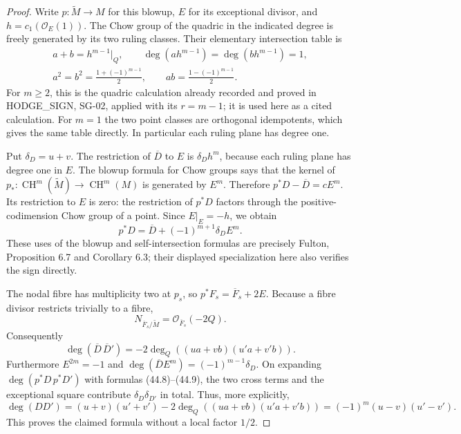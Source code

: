 \begin{proof}
Write $p:\widetilde M\to M$ for this blowup, $E$ for its exceptional
divisor, and $h=c_1(\mathcal O_E(1))$.  The Chow group of the quadric
in the indicated degree is freely generated by its two ruling
classes.  Their elementary intersection table is
\[
 \begin{gathered}
 a+b=h^{m-1}|_Q,\qquad
 \deg(a h^{m-1})=\deg(b h^{m-1})=1,\\
 a^2=b^2=\frac{1+(-1)^{m-1}}2,\qquad
 ab=\frac{1-(-1)^{m-1}}2.
 \end{gathered}                                             \tag{44.7}
\]
For $m\ge2$, this is the quadric calculation already recorded and
proved in HODGE\_SIGN, SG-02, applied with its $r=m-1$; it is used
here as a cited calculation.  For $m=1$ the two point classes are
orthogonal idempotents, which gives the same table directly.
In particular each ruling plane has degree one.

Put $\delta_D=u+v$.  The restriction of $\overline D$ to $E$ is
$\delta_Dh^m$, because each ruling plane has degree one in $E$.
The blowup formula for Chow groups says that the kernel of
$p_*:\operatorname{CH}^{m}(\widetilde M)\to\operatorname{CH}^{m}(M)$
is generated by $E^m$.  Therefore $p^*D-\overline D=cE^m$.
Its restriction to $E$ is zero: the restriction of $p^*D$ factors
through the positive-codimension Chow group of a point.  Since
$E|_E=-h$, we obtain
\[
 p^*D=\overline D+(-1)^{m+1}\delta_D E^m.                   \tag{44.8}
\]
These uses of the blowup and self-intersection formulas are precisely
Fulton, Proposition 6.7 and Corollary 6.3; their displayed
specialization here also verifies the sign directly.

The nodal fibre has multiplicity two at $p_s$, so
$p^*F_s=\overline F_s+2E$.  Because a fibre divisor restricts
trivially to a fibre,
\[
 N_{\overline F_s/\widetilde M}=\mathcal O_{\overline F_s}(-2Q).
\]
Consequently
\[
 \deg(\overline D\,\overline D')=-2\deg_Q((ua+vb)(u'a+v'b)).
 \tag{44.9}
\]
Furthermore $E^{2m}=-1$ and
$\deg(\overline D E^m)=(-1)^{m-1}\delta_D$.  On expanding
$\deg(p^*D\,p^*D')$ with formulas (44.8)--(44.9), the two cross terms and
the exceptional square contribute $\delta_D\delta_{D'}$ in total.
Thus, more explicitly,
\[
 \deg(DD')=(u+v)(u'+v')-2\deg_Q((ua+vb)(u'a+v'b))
          =(-1)^m(u-v)(u'-v').
\]
This proves the claimed formula without a local factor $1/2$.


\end{proof}
